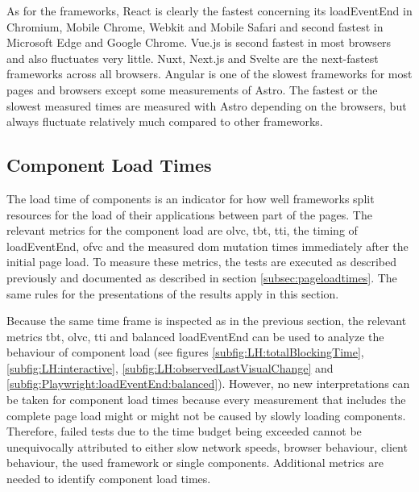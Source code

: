 \documentclass[a4paper, 10pt]{article}
\begin{document}
As for the frameworks, React is clearly the fastest concerning its loadEventEnd in Chromium, Mobile Chrome, Webkit and Mobile Safari and second fastest in Microsoft Edge and Google Chrome.
Vue.js is second fastest in most browsers and also fluctuates very little. Nuxt, Next.js and Svelte are the next-fastest frameworks across all browsers.
Angular is one of the slowest frameworks for most pages and browsers except some measurements of Astro.
The fastest or the slowest measured times are measured with Astro depending on the browsers, but always fluctuate relatively much compared to other frameworks.


\subsection{Component Load Times}\label{subsec:componentloadtimes}


The load time of components is an indicator for how well frameworks split resources for the load of their applications between part of the pages.
The relevant metrics for the component load are \acrfull{olvc}, \acrfull{tbt}, \acrfull{tti}, the timing of loadEventEnd, \acrfull{ofvc} and the measured \acrshort{dom} mutation times immediately after the initial page load.
To measure these metrics, the tests are executed as described previously and documented as described in section \ref{subsec:pageloadtimes}.
The same rules for the presentations of the results apply in this section.

Because the same time frame is inspected as in the previous section, the relevant metrics \acrshort{tbt}, \acrshort{olvc}, \acrshort{tti} and balanced loadEventEnd can be used to analyze the behaviour of component load (see figures \ref{subfig:LH:totalBlockingTime}, \ref{subfig:LH:interactive}, \ref{subfig:LH:observedLastVisualChange} and \ref{subfig:Playwright:loadEventEnd:balanced}).
However, no new interpretations can be taken for component load times because every measurement that includes the complete page load might or might not be caused by slowly loading components.
Therefore, failed tests due to the time budget being exceeded cannot be unequivocally attributed to either slow network speeds, browser behaviour, client behaviour, the used framework or single components.
Additional metrics are needed to identify component load times.
\end{document}
